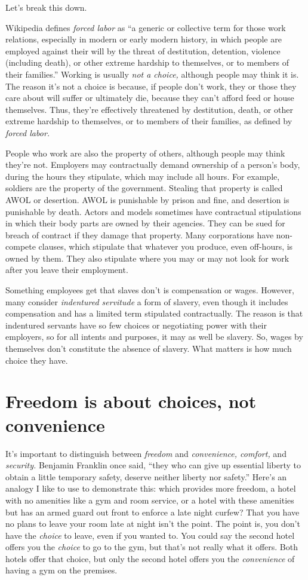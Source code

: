 Let's break this down.

Wikipedia defines \emph{forced labor} as ``a generic or collective term for those work relations, especially in modern or early modern history, in which people are employed against their will by the threat of destitution, detention, violence (including death), or other extreme hardship to themselves, or to members of their families.''\cite{wikipedia-forced-labor} Working is usually \emph{not a choice,} although people may think it is. The reason it's not a choice is because, if people don't work, they or those they care about will suffer or ultimately die, because they can't afford feed or house themselves. Thus, they're effectively threatened by destitution, death, or other extreme hardship to themselves, or to members of their families, as defined by \emph{forced labor.}

People who work are also the property of others, although people may think they're not. Employers may contractually demand ownership of a person's body, during the hours they stipulate, which may include all hours. For example, soldiers are the property of the government. Stealing that property is called AWOL or desertion. AWOL is punishable by prison and fine, and desertion is punishable by death. Actors and models sometimes have contractual stipulations in which their body parts are owned by their agencies. They can be sued for breach of contract if they damage that property. Many corporations have non-compete clauses, which stipulate that whatever you produce, even off-hours, is owned by them. They also stipulate where you may or may not look for work after you leave their employment.

Something employees get that slaves don't is compensation or wages. However, many consider \emph{indentured servitude} a form of slavery, even though it includes compensation and has a limited term stipulated contractually. The reason is that indentured servants have so few choices or negotiating power with their employers, so for all intents and purposes, it may as well be slavery. So, wages by themselves don't constitute the absence of slavery. What matters is how much choice they have.

\section{Freedom is about choices, not convenience}
It's important to distinguish between \emph{freedom} and \emph{convenience, comfort,} and \emph{security.} Benjamin Franklin once said, ``they who can give up essential liberty to obtain a little temporary safety, deserve neither liberty nor safety.'' Here's an analogy I like to use to demonstrate this: which provides more freedom, a hotel with no amenities like a gym and room service, or a hotel with these amenities but has an armed guard out front to enforce a late night curfew? That you have no plans to leave your room late at night isn't the point. The point is, you don't have the \emph{choice} to leave, even if you wanted to. You could say the second hotel offers you the \emph{choice} to go to the gym, but that's not really what it offers. Both hotels offer that choice, but only the second hotel offers you the \emph{convenience} of having a gym on the premises.

